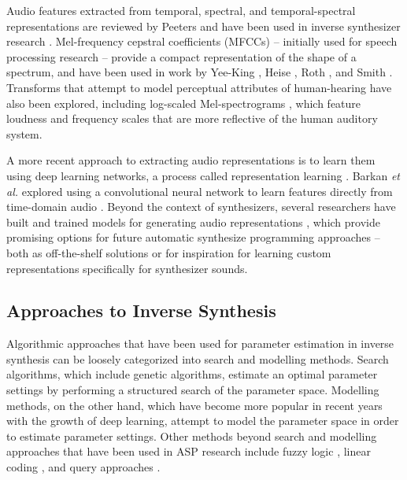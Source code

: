 Audio features extracted from temporal, spectral, and temporal-spectral representations are reviewed by Peeters \cite{peeters2004large} and have been used in inverse synthesizer research \cite{mintz2007toward, stowell2010making, mcartwright2014, blancas2014sound}. Mel-frequency cepstral coefficients (MFCCs) -- initially used for speech processing research -- provide a compact representation of the shape of a spectrum, and have been used in work by Yee-King \cite{yee2008synthbot}, Heise \cite{ heise2009automatic}, Roth \cite{roth2011comparison}, and Smith \cite{smith2017play}. Transforms that attempt to model perceptual attributes of human-hearing have also been explored, including log-scaled Mel-spectrograms \cite{zhang2018visualization}, which feature loudness and frequency scales that are more reflective of the human auditory system.

A more recent approach to extracting audio representations is to learn them using deep learning networks, a process called representation learning  \cite{bengio2013representation}. Barkan \textit{et al.} explored using a convolutional neural network to learn features directly from time-domain audio \cite{barkan2019inversynth}. Beyond the context of synthesizers, several researchers have built and trained models for generating audio representations \cite{cramer:learnmore:icassp:19, drossos:icml:2020, engel2017neural}, which provide promising options for future automatic synthesize programming approaches -- both as off-the-shelf solutions or for inspiration for learning custom representations specifically for synthesizer sounds.

\subsection{Approaches to Inverse Synthesis}
Algorithmic approaches that have been used for parameter estimation in inverse synthesis can be loosely categorized into search and modelling methods. Search algorithms, which include genetic algorithms, estimate an optimal parameter settings by performing a structured search of the parameter space. Modelling methods, on the other hand, which have become more popular in recent years with the growth of deep learning, attempt to model the parameter space in order to estimate parameter settings. Other methods beyond search and modelling approaches that have been used in ASP research include fuzzy logic \cite{mitchell2005frequency, hamadicharef2012intelligent}, linear coding \cite{mintz2007toward}, and query approaches \cite{mcartwright2014}.

